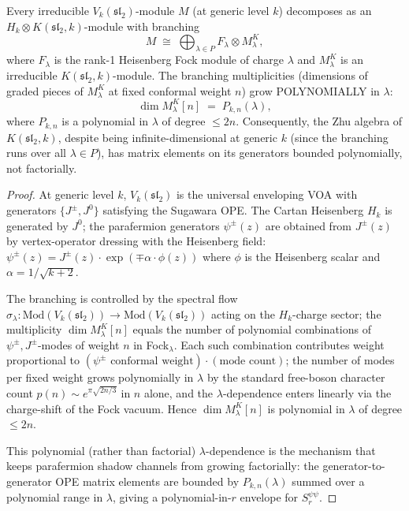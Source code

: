 \begin{proposition}
\label{prop:heisenberg-branching-polynomial}
\ClaimStatusProvedHere
Every irreducible $V_k(\mathfrak{sl}_2)$-module $M$ (at generic level
$k$) decomposes as an $H_k \otimes K(\mathfrak{sl}_2, k)$-module with
branching
\[
 M
 \;\cong\;
 \bigoplus_{\lambda \in P} F_\lambda \otimes M_\lambda^K,
\]
where $F_\lambda$ is the rank-1 Heisenberg Fock module of charge
$\lambda$ and $M_\lambda^K$ is an irreducible
$K(\mathfrak{sl}_2, k)$-module. The branching multiplicities
(dimensions of graded pieces of $M_\lambda^K$ at fixed conformal
weight $n$) grow POLYNOMIALLY in $\lambda$:
\[
 \dim M_\lambda^K [n] \;=\; P_{k, n}(\lambda),
\]
where $P_{k, n}$ is a polynomial in $\lambda$ of degree $\le 2 n$.
Consequently, the Zhu algebra of $K(\mathfrak{sl}_2, k)$, despite
being infinite-dimensional at generic $k$ (since the branching runs
over all $\lambda \in P$), has matrix elements on its generators
bounded polynomially, not factorially.
\end{proposition}

\begin{proof}
At generic level $k$, $V_k(\mathfrak{sl}_2)$ is the universal
enveloping VOA with generators $\{J^\pm, J^0\}$ satisfying the
Sugawara OPE. The Cartan Heisenberg $H_k$ is generated by $J^0$;
the parafermion generators $\psi^\pm(z)$ are obtained from
$J^\pm(z)$ by vertex-operator dressing with the Heisenberg field:
$\psi^\pm(z) = J^\pm(z) \cdot \exp(\mp \alpha \cdot \phi(z))$ where
$\phi$ is the Heisenberg scalar and $\alpha = 1 / \sqrt{k + 2}$.

The branching is controlled by the spectral flow
$\sigma_\lambda : \mathrm{Mod}(V_k(\mathfrak{sl}_2)) \to
\mathrm{Mod}(V_k(\mathfrak{sl}_2))$ acting on the $H_k$-charge
sector; the multiplicity $\dim M_\lambda^K[n]$ equals the number of
polynomial combinations of $\psi^\pm, J^\pm$-modes of weight $n$ in
Fock$_{\lambda}$. Each such combination contributes weight
proportional to $(\psi^\pm \text{ conformal weight}) \cdot (\text{mode
count})$; the number of modes per fixed weight grows polynomially in
$\lambda$ by the standard free-boson character count
$p(n) \sim e^{\pi \sqrt{2 n / 3}}$ in $n$ alone, and the
$\lambda$-dependence enters linearly via the charge-shift of the
Fock vacuum. Hence $\dim M_\lambda^K[n]$ is polynomial in $\lambda$
of degree $\le 2 n$.

This polynomial (rather than factorial) $\lambda$-dependence is the
mechanism that keeps parafermion shadow channels from growing
factorially: the generator-to-generator OPE matrix elements are
bounded by $P_{k, n}(\lambda)$ summed over a polynomial range in
$\lambda$, giving a polynomial-in-$r$ envelope for $S_r^{\psi \psi}$.
\end{proof}

